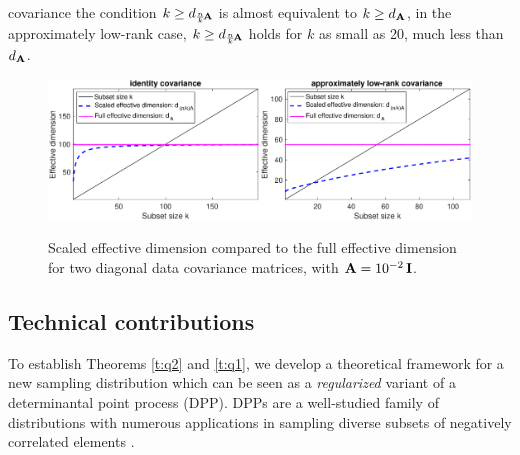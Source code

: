 \documentclass[../../thesis.tex]{subfiles}
\begin{document}
covariance the condition $k\geq
  d_{\frac nk\!\mathbf A}$ is almost equivalent to $k\geq d_{\mathbf A}$, in the
approximately low-rank case, $k\geq d_{\frac nk\!\mathbf A}$ holds for
$k$ as small as 20, much less than $d_{\mathbf A}$.
\begin{figure}[htbp]
  \centering
  \includegraphics[width=0.5\textwidth]{design/figs/deff_identity}\nobreak\includegraphics[width=0.5\textwidth]{design/figs/deff_lowrank}
  \caption{Scaled effective dimension compared to the full effective
  dimension for two diagonal data covariance matrices, with
  $\mathbf A=10^{-2}\,\mathbf I$.}
  \label{f:deff}
\end{figure}




\subsection{Technical contributions}
To establish Theorems \ref{t:q2} and \ref{t:q1},
we develop a theoretical framework for a new sampling distribution
which can be seen as a \emph{regularized} variant of a determinantal point
process (DPP). DPPs are a well-studied family of distributions
with numerous applications in sampling diverse subsets
of negatively correlated elements \citep[see][]{dpp-ml}.
\end{document}
